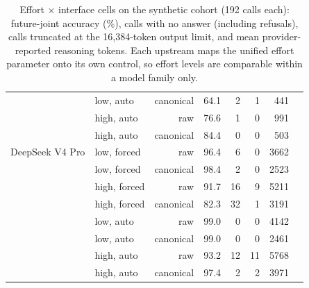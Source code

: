 \begin{table}[htbp]
\begin{tabular}{llrrrrrr}
 & low, auto & canonical & 64.1 & 2 & 1 & 441 &  \\
 & high, auto & raw & 76.6 & 1 & 0 & 991 &  \\
 & high, auto & canonical & 84.4 & 0 & 0 & 503 &  \\
\midrule
DeepSeek V4 Pro & low, forced & raw & 96.4 & 6 & 0 & 3662 &  \\
 & low, forced & canonical & 98.4 & 2 & 0 & 2523 &  \\
 & high, forced & raw & 91.7 & 16 & 9 & 5211 &  \\
 & high, forced & canonical & 82.3 & 32 & 1 & 3191 &  \\
 & low, auto & raw & 99.0 & 0 & 0 & 4142 &  \\
 & low, auto & canonical & 99.0 & 0 & 0 & 2461 &  \\
 & high, auto & raw & 93.2 & 12 & 11 & 5768 &  \\
 & high, auto & canonical & 97.4 & 2 & 2 & 3971 &  \\
\bottomrule
\end{tabular}
\caption{Effort $\times$ interface cells on the synthetic cohort (192 calls each): future-joint accuracy (\%), calls with no answer (including refusals), calls truncated at the 16,384-token output limit, and mean provider-reported reasoning tokens. Each upstream maps the unified effort parameter onto its own control, so effort levels are comparable within a model family only.}
\label{tab:ladder_cells}
\end{table}

